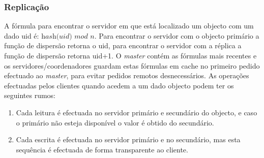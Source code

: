 \subsubsection{Replicação}
A fórmula para encontrar o servidor em que está localizado um objecto com um dado uid é: $\textit{hash(uid) mod n}$. Para encontrar o servidor com o objecto primário a função de dispersão retorna o uid, para encontrar o servidor com a réplica a função de dispersão retorna uid+1. O \textit{master} contém as fórmulas mais recentes e os servidores/coordenadores guardam estas fórmulas em cache no primeiro pedido efectuado ao \textit{master}, para evitar pedidos remotos desnecessários.
As operações efectuadas pelos clientes quando acedem a um dado objecto podem ter os seguintes rumos:

\begin{enumerate}
\item
Cada leitura é efectuada no servidor primário e secundário do objecto, e caso o primário não esteja disponível o valor é obtido do secundário.
\item
Cada escrita é efectuada no servidor primário e no secundário, mas esta sequência é efectuada de forma transparente ao cliente. 
\end{enumerate}
